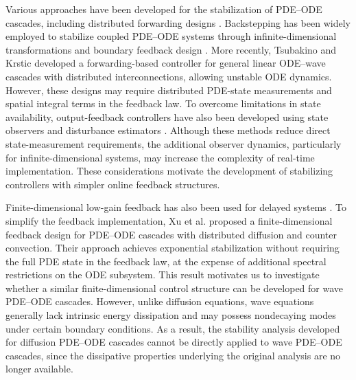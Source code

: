 \documentclass{IEEEtran}
\theoremstyle{definition}
\begin{document}
Various approaches have been developed for the stabilization of PDE--ODE cascades, including distributed forwarding designs \cite{xu_backstepping-forwarding_2024}. Backstepping has been widely employed to stabilize coupled PDE--ODE systems through infinite-dimensional transformations and boundary feedback design \cite{krstic_backstepping_2008,krstic_compensating_2009,susto_control_2010,bekiaris-liberis_compensating_2010,bekiaris-liberis_compensating_2011,krstic_lyapunov_2010}. More recently, Tsubakino and Krstic \cite{tsubakino_forwarding-based_2024} developed a forwarding-based controller for general linear ODE--wave cascades with distributed interconnections, allowing unstable ODE dynamics. However, these designs may require distributed PDE-state measurements and spatial integral terms in the feedback law. To overcome limitations in state availability, output-feedback controllers have also been developed using state observers and disturbance estimators \cite{than_output-feedback_2021,mei_infinite-dimensional_2023,feng_output-feedback_2024}. Although these methods reduce direct state-measurement requirements, the additional observer dynamics, particularly for infinite-dimensional systems, may increase the complexity of real-time implementation. These considerations motivate the development of stabilizing controllers with simpler online feedback structures.



Finite-dimensional low-gain feedback has also been used for delayed systems \cite{lin_semiglobal_1993,zhou_stabilization_2012,xu_stability_2020}. To simplify the feedback implementation, Xu et al. \cite{xu_low-gain_2023} proposed a finite-dimensional feedback design for PDE--ODE cascades with distributed diffusion and counter convection. Their approach achieves exponential stabilization without requiring the full PDE state in the feedback law, at the expense of additional spectral restrictions on the ODE subsystem. This result motivates us to investigate whether a similar finite-dimensional control structure can be developed for wave PDE--ODE cascades. However, unlike diffusion equations, wave equations generally lack intrinsic energy dissipation and may possess nondecaying modes under certain boundary conditions. As a result, the stability analysis developed for diffusion PDE--ODE cascades cannot be directly applied to wave PDE--ODE cascades, since the dissipative properties underlying the original analysis are no longer available.
\end{document}
